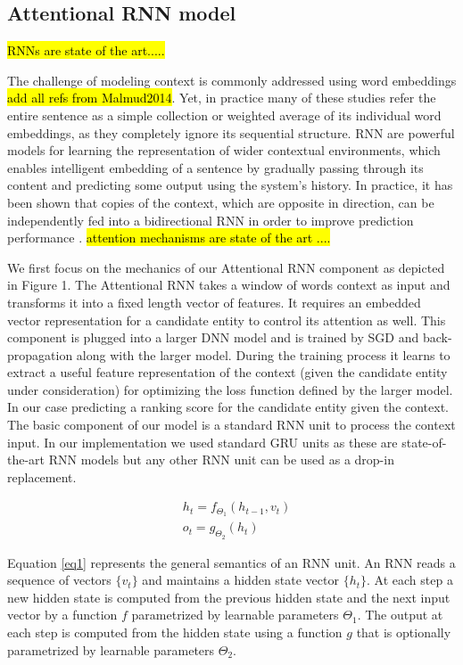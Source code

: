 \documentclass[11pt]{article}
\begin{document}
	\subsection{Attentional RNN model}
	
	\hl{RNNs are state of the art..... }
	
	The challenge of modeling context is commonly addressed using word embeddings \cite{} \hl{add all refs from Malmud2014}. Yet, in practice many of these studies refer the entire sentence as a simple collection or weighted average of its individual word embeddings, as they completely ignore its sequential structure. RNN are powerful models for learning the representation of wider contextual environments, which enables intelligent embedding of a sentence by gradually passing through its content and predicting some output using the system's history. In practice, it has been shown that copies of the context, which are opposite in direction, can be independently fed into a bidirectional RNN in order to improve prediction performance \cite{Munich2004c,Melamud2014a}. 
	\hl{attention mechanisms are state of the art ....}
	
	We first focus on the mechanics of our Attentional RNN component as depicted in Figure 1. The Attentional RNN takes a window of words context as input and transforms it into a fixed length vector of features. It requires an embedded vector representation for a candidate entity to control its attention as well. This component is plugged into a larger DNN model and is trained by SGD and back-propagation along with the larger model. During the training process it learns to extract a useful feature representation of the context (given the candidate entity under consideration) for optimizing the loss function defined by the larger model. In our case predicting a ranking score for the candidate entity given the context.
	The basic component of our model is a standard RNN unit to process the context input. In our implementation we used standard GRU units \cite{cho2014learning} as these are state-of-the-art RNN models but any other RNN unit can be used as a drop-in replacement. 
	
	\begin{equation}
	\label{eq1}
	\begin{aligned}
	& h_t=f_{\Theta_1}(h_{t-1}, v_t) \\
	& o_t=g_{\Theta_2}(h_t)
	\end{aligned}
	\end{equation}
	
	Equation \ref{eq1} represents the general semantics of an RNN unit. An RNN reads a sequence of vectors $\{v_t\}$ and maintains a hidden state vector $\{h_t\}$. At each step a new hidden state is computed from the previous hidden state and the next input vector by a function $f$ parametrized by learnable parameters $\Theta_1$. The output at each step is computed from the hidden state using a function $g$ that is optionally parametrized by learnable parameters $\Theta_2$. 
	
\end{document}
